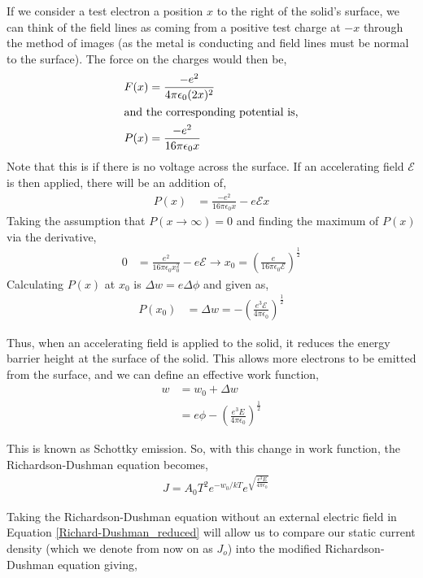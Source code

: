 If we consider a test electron a position $x$ to the right of the solid's surface, we can think of the field lines as coming from a positive test charge at $-x$ through the method of images (as the metal is conducting and field lines must be normal to the surface). The force on the charges would then be,
\begin{align}
    F(x) &= \frac{-e^2}{4\pi \epsilon_0 (2x)^2} \\
    \intertext{and the corresponding potential is,}
    P(x) &= \frac{-e^2}{16\pi \epsilon_0 x}
\end{align}
Note that this is if there is no voltage across the surface. If an accelerating field $\mathcal{E}$ is then applied, there will be an addition of,
\begin{align}
    P(x) &=  \frac{-e^2}{16\pi \epsilon_0 x} - e \mathcal{E} x
\end{align}
Taking the assumption that $P(x\rightarrow \infty) = 0$ and finding the maximum of $P(x)$ via the derivative,
\begin{align}
    0 &= \frac{e^2}{16\pi \epsilon_0 x_0^2} - e\mathcal{E} \rightarrow x_0 = \left( \frac{e}{16\pi \epsilon_0 \mathcal{E}} \right)^\frac{1}{2}
\end{align}
Calculating $P(x)$ at $x_0$ is $\Delta w = e\Delta\phi$ and given as,
\begin{align}
    P(x_0) &= \Delta w =  -\left( \frac{e^3 \mathcal{E}}{4\pi \epsilon_0} \right)^\frac1{2}
\end{align}

Thus, when an accelerating field is applied to the solid, it reduces the energy barrier height at the surface of the solid. This allows more electrons to be emitted from the surface, and we can define an effective work function,
\begin{align}
    w &= w_0 + \Delta w \\
      &= e\phi - \left( \frac{e^3 E}{4\pi \epsilon_0} \right)^{\frac{1}{2}}
\end{align}

This is known as Schottky emission. So, with this change in work function, the Richardson-Dushman equation becomes,
\begin{align}
    & \boxed{J = A_0 T^2e^{-w_0/kT}e^{\sqrt{\frac{e^3 E}{4\pi \epsilon_0}}}}\label{Richardson-Dushman_Schottky}
\end{align}

Taking the Richardson-Dushman equation without an external electric field in Equation \ref{Richard-Dushman_reduced} will allow us to compare our static current density (which we denote from now on as $J_o$) into the modified Richardson-Dushman equation giving,

